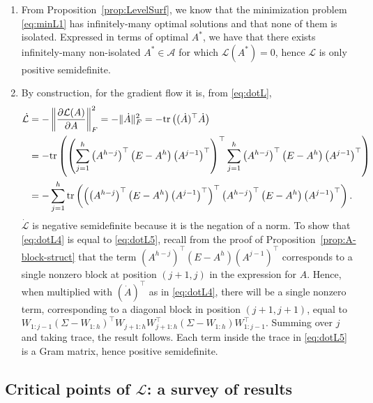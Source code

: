 \documentclass{article}
\makeatletter
\renewenvironment{proof}[1][\proofname]{
  \par\pushQED{\qed}\normalfont
  \topsep6\p@\@plus6\p@\relax
  \trivlist\item[\hskip\labelsep\bfseries#1\@addpunct{.}]
  \ignorespaces
}{
  \popQED\endtrivlist\@endpefalse
}
\def\tr{{\rm tr}}
\newcommand{\1}{\mathds{1}}
\newcommand{\benu}{\begin{enumerate}}
\newcommand{\eenu}{\end{enumerate}}
\makeatother
\begin{document}
\begin{proof}
\benu
\item From Proposition~\ref{prop:LevelSurf}, we know that the minimization problem \eqref{eq:minL1} has infinitely-many optimal solutions and that none of them is isolated. Expressed in terms of optimal $A^\ast $, we have that there exists infinitely-many non-isolated $ A^\ast \in \mathcal{A}$ for which $ \mathcal{L}(A^\ast) =0 $, hence $ \mathcal{L}$ is only positive semidefinite. 
\item By construction, for the gradient flow it is, from \eqref{eq:dotL}, 
\begin{align}
\label{eq:dotL3}
\dot{\mathcal{L}}  & = - \left\| \frac{\partial \mathcal{L}(A) }{\partial A}  \right\|_F^2
=- \| \dot A  \|_F^2 
= - \tr \left((\dot{A}) ^\top \dot{A} \right) \\
& =  - \tr \left( \left( \sum_{j=1}^h \left(A^{h-j}\right)^\top \left( E - A^h \right) \left( A^{j-1}  \right) ^\top \right)^\top \sum_{j=1}^h \left(A^{h-j}\right)^\top \left( E - A^h \right) \left( A^{j-1}  \right) ^\top  \right)
\label{eq:dotL4} \\
& = -  \sum_{j=1}^h \tr \left( \left( \left(A^{h-j}\right)^\top \left( E - A^h \right) \left( A^{j-1}  \right) ^\top  \right) ^\top \left(A^{h-j}\right)^\top \left( E - A^h \right) \left( A^{j-1}  \right) ^\top   \right).
\label{eq:dotL5}
\end{align}
$\dot{\mathcal{L}}$ is negative semidefinite because it is the negation of a norm.
To show that \eqref{eq:dotL4} is equal to \eqref{eq:dotL5}, recall from the proof of Proposition~\ref{prop:A-block-struct} that the term $ 
\left(A^{h-j}\right)^\top \left( E - A^h \right) \left( A^{j-1}  \right) ^\top $ corresponds to a single nonzero block at position $ (j+1,j)$ in the expression for $A$.
Hence, when multiplied with $ (\dot{A}) ^\top $ as in \eqref{eq:dotL4}, there will be a single nonzero term, corresponding to a diagonal block in position $ (j+1, j+1)$, equal to 
$
W_{1:j-1}(\Sigma-W_{1:h})^\top W_{j+1:h} W_{j+1:h}^\top(\Sigma-W_{1:h})W_{1:j-1}^\top .
$
Summing over $j$ and taking trace, the result follows. 
Each term inside the trace in \eqref{eq:dotL5} is a Gram matrix, hence positive semidefinite.
 \eenu
\end{proof}



\subsection{Critical points of $ \mathcal{L}$: a survey of results}
\end{document}
